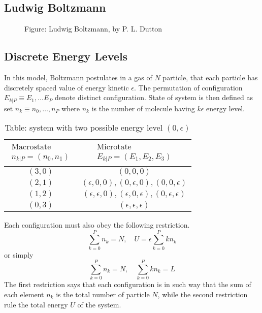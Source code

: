 \documentclass[../../../Main.tex]{subfiles}
\begin{document}
\subsection{Ludwig Boltzmann}
\begin{figure*}[h]
    \centering
    \caption*{Figure: Ludwig Boltzmann, by P. L. Dutton}
\end{figure*}
\subsection{Discrete Energy Levels}
In this model, Boltzmann postulates in a gas of $N$ particle, that each particle has discretely spaced value of energy kinetic $\epsilon$. The permutation of configuration $E_{k|P}\equiv E_1,\dots E_P$ denote distinct configuration. State of system is then defined as set $n_k\equiv n_0,\dots, n_P$ where $n_k$ is the number of molecule having $k\epsilon$ energy level.

\begin{table}[h]
    \centering
    \caption*{Table: system with two possible energy level $(0, \epsilon)$}
    \begin{tabular}{cc} 
        \toprule
        $\begin{array}{c}\text{Macrostate} \\n_{k|P}=(n_0,n_1)\end{array}$  &  $\begin{array}{c}\text{Microtate} \\ E_{k|P}=(E_1 , E_2 , E_3 )\end{array}$ \\
        \midrule
        $(3, 0)$&$(0, 0, 0)$\\
        $(2, 1)$&$(\epsilon, 0, 0), (0, \epsilon, 0), (0, 0, \epsilon)$\\
        $(1, 2)$&$(\epsilon, \epsilon, 0), (\epsilon, 0, \epsilon), (0, \epsilon, \epsilon)$\\
        $(0, 3)$&$(\epsilon, \epsilon, \epsilon)$\\
        \bottomrule
    \end{tabular}
\end{table}

Each configuration must also obey the following restriction.
\begin{equation*}
    \sum_{k=0}^{P}n_k=N,\quad U=\epsilon\sum_{k=0}^{P} kn_k
\end{equation*}
or simply
\begin{equation*}
    \sum_{k=0}^{P}n_k=N,\quad \sum_{k=0}^{P} kn_k=L
\end{equation*}
The first restriction says that each configuration is in such way that the sum of each element $n_k$ is the total number of particle $N$, while the second restriction rule the total energy $U$ of the system.
\end{document}
